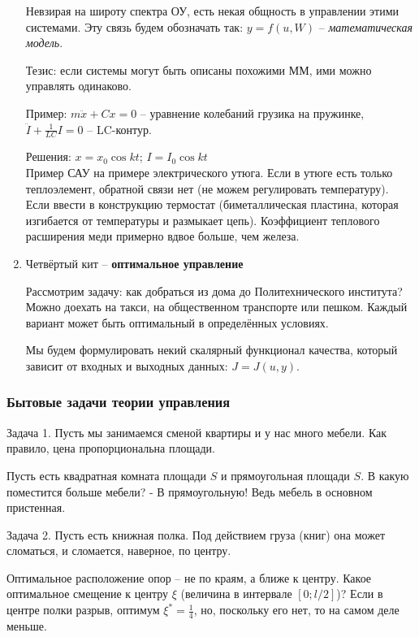 \documentclass[main.tex]{subfiles}
\begin{document}
\begin{enumerate}
	Невзирая на широту спектра ОУ, есть некая общность в управлении этими системами. Эту связь будем обозначать так: $ y = f(u, W) $ -- \emph{математическая модель}.
	
	Тезис: если системы могут быть описаны похожими ММ, ими можно управлять одинаково.
	
	Пример: $ m\ddot{x} + Cx = 0 $ -- уравнение колебаний грузика на пружинке, $ \ddot I + \frac{1}{LC}I = 0 $ -- LC-контур.
	
	Решения: $ x = x_0 \cos kt $; $ I = I_0 \cos kt $ \\
	
	
	Пример САУ на примере электрического утюга. Если в утюге есть только теплоэлемент, обратной связи нет (не можем регулировать температуру).
	Если ввести в конструкцию термостат (биметаллическая пластина, которая изгибается от температуры и размыкает цепь). Коэффициент теплового расширения меди примерно вдвое больше, чем железа. 
	
	\item Четвёртый кит -- \textbf{оптимальное управление}
	
	Рассмотрим задачу: как добраться из дома до Политехнического института?
	Можно доехать на такси, на общественном транспорте или пешком.
	Каждый вариант может быть оптимальный в определённых условиях.
	
	Мы будем формулировать некий скалярный функционал качества, который зависит от входных и выходных данных: $ J = J(u, y) $.
	
\end{enumerate}

\subsubsection{Бытовые задачи теории управления}

Задача 1. Пусть мы занимаемся сменой квартиры и у нас много мебели. Как правило, цена пропорциональна площади.

Пусть есть квадратная комната площади $ S $ и прямоугольная площади $ S $.
В какую поместится больше мебели? - В прямоугольную! Ведь мебель в основном пристенная.

Задача 2. Пусть есть книжная полка. Под действием груза (книг) она может сломаться, и сломается, наверное, по центру.

Оптимальное расположение опор -- не по краям, а ближе к центру. Какое оптимальное смещение к центру $ \xi $ (величина в интервале $ [0; l/2] $)? Если в центре полки разрыв, оптимум $ \xi^* = \frac{1}{4} $, но, поскольку его нет, то на самом деле меньше.
\end{document}

